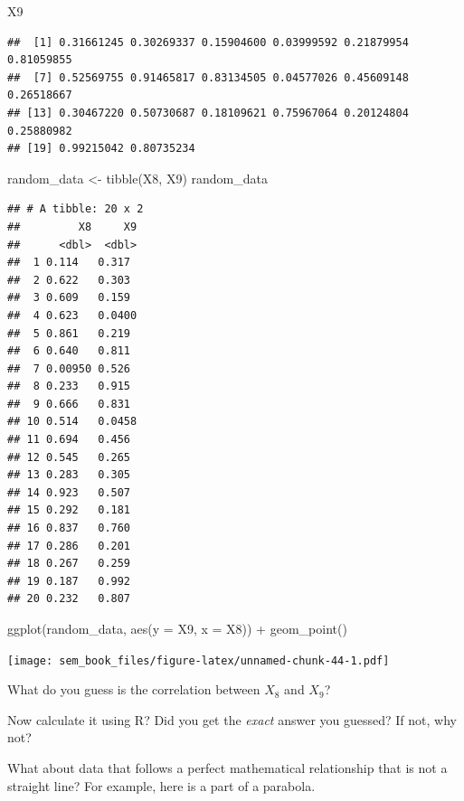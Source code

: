 \documentclass[
]{book}
\newenvironment{Shaded}{\begin{snugshade}}{\end{snugshade}}
\newcommand{\AttributeTok}[1]{\textcolor[rgb]{0.77,0.63,0.00}{#1}}
\newcommand{\FunctionTok}[1]{\textcolor[rgb]{0.00,0.00,0.00}{#1}}
\newcommand{\NormalTok}[1]{#1}
\newcommand{\OtherTok}[1]{\textcolor[rgb]{0.56,0.35,0.01}{#1}}
\newcommand{\SpecialCharTok}[1]{\textcolor[rgb]{0.00,0.00,0.00}{#1}}
\begin{document}
\begin{Shaded}
\begin{Highlighting}[]
\NormalTok{X9}
\end{Highlighting}
\end{Shaded}

\begin{verbatim}
##  [1] 0.31661245 0.30269337 0.15904600 0.03999592 0.21879954 0.81059855
##  [7] 0.52569755 0.91465817 0.83134505 0.04577026 0.45609148 0.26518667
## [13] 0.30467220 0.50730687 0.18109621 0.75967064 0.20124804 0.25880982
## [19] 0.99215042 0.80735234
\end{verbatim}

\begin{Shaded}
\begin{Highlighting}[]
\NormalTok{random\_data }\OtherTok{\textless{}{-}} \FunctionTok{tibble}\NormalTok{(X8, X9)}
\NormalTok{random\_data}
\end{Highlighting}
\end{Shaded}

\begin{verbatim}
## # A tibble: 20 x 2
##         X8     X9
##      <dbl>  <dbl>
##  1 0.114   0.317 
##  2 0.622   0.303 
##  3 0.609   0.159 
##  4 0.623   0.0400
##  5 0.861   0.219 
##  6 0.640   0.811 
##  7 0.00950 0.526 
##  8 0.233   0.915 
##  9 0.666   0.831 
## 10 0.514   0.0458
## 11 0.694   0.456 
## 12 0.545   0.265 
## 13 0.283   0.305 
## 14 0.923   0.507 
## 15 0.292   0.181 
## 16 0.837   0.760 
## 17 0.286   0.201 
## 18 0.267   0.259 
## 19 0.187   0.992 
## 20 0.232   0.807
\end{verbatim}

\begin{Shaded}
\begin{Highlighting}[]
\FunctionTok{ggplot}\NormalTok{(random\_data, }\FunctionTok{aes}\NormalTok{(}\AttributeTok{y =}\NormalTok{ X9, }\AttributeTok{x =}\NormalTok{ X8)) }\SpecialCharTok{+}
    \FunctionTok{geom\_point}\NormalTok{()}
\end{Highlighting}
\end{Shaded}

\texttt{[image: sem\_book\_files/figure-latex/unnamed-chunk-44-1.pdf]}

What do you guess is the correlation between \(X_{8}\) and \(X_{9}\)?

Now calculate it using R? Did you get the \emph{exact} answer you guessed? If not, why not?

What about data that follows a perfect mathematical relationship that is not a straight line? For example, here is a part of a parabola.
\end{document}
